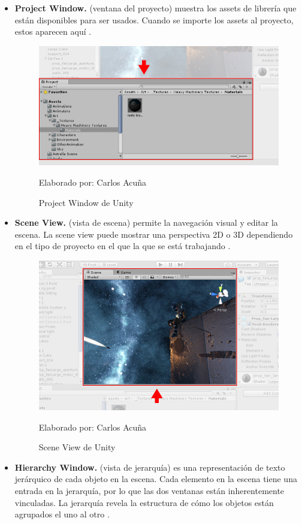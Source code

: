 \documentclass[a4paper, openright, 12pt]{report}
\begin{document}
\begin{itemize}

\item \textbf{Project Window.} (ventana del proyecto) muestra los assets de librería que están disponibles para ser usados. Cuando se importe los assets al proyecto, estos aparecen aquí \cite{2020unity}.

\begin{figure}[h]
\captionsetup{justification=centering,margin=2cm}
\includegraphics[scale=0.4]{unity02}
\centering
\caption{Project Window de Unity}
Elaborado por: Carlos Acuña
\label{fig:unity02}
\end{figure}

\item \textbf{ Scene View.} (vista de escena) permite la navegación visual y editar la escena. La scene view puede mostrar una perspectiva 2D o 3D dependiendo en el tipo de proyecto en el que la que se está trabajando \cite{2020unity}.

\begin{figure}[h]
\captionsetup{justification=centering,margin=2cm}
\includegraphics[scale=0.4]{unity03}
\centering
\caption{Scene View de Unity}
Elaborado por: Carlos Acuña
\label{fig:unity03}
\end{figure}
\clearpage
\item \textbf{ Hierarchy Window.} (vista de jerarquía) es una representación de texto jerárquico de cada objeto en la escena. Cada elemento en la escena tiene una entrada en la jerarquía, por lo que las dos ventanas están inherentemente vinculadas. La jerarquía revela la estructura de cómo los objetos están agrupados el uno al otro \cite{2020unity}.


\end{itemize}
\end{document}
